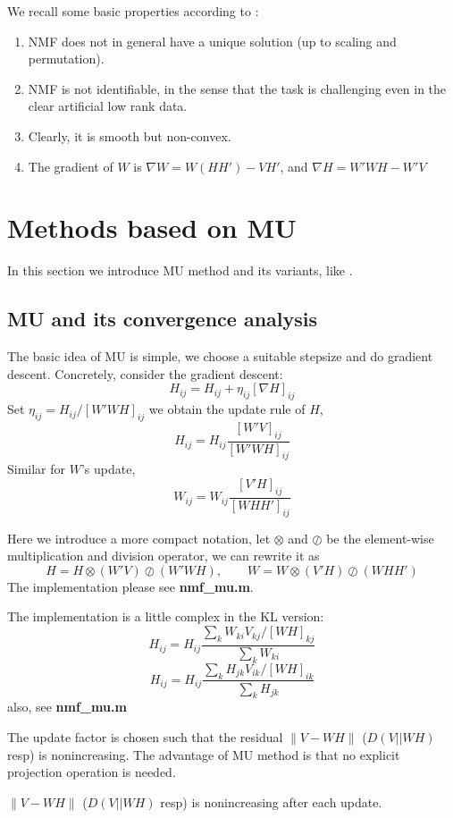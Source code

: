 \documentclass{article}
\renewcommand{\grad}{\nabla}
\begin{document}
We recall some basic properties according to \cite{review}:
\begin{enumerate}
	\item NMF does not in general have a unique solution (up to scaling and permutation).
	\item NMF is not identifiable, in the sense that the task is challenging even in the clear artificial low rank data.
	\item Clearly, it is smooth but non-convex.
	\item The gradient of $W$ is $\nabla W = W(HH')-VH'$, and $\nabla H = W'WH-W'V$
\end{enumerate}
\section{Methods based on MU}
In this section we introduce MU method and its variants, like \cite{mu,muacc,mumod,mumod2}.
\subsection{MU and its convergence analysis}
The basic idea of MU is simple, we choose a suitable stepsize and do gradient descent. Concretely, consider the gradient descent:
$$ H_{ij} = H_{ij} + \eta_{ij}[\grad H]_{ij}$$
Set $\eta_{ij} = H_{ij}/[W'WH]_{ij}$ we obtain the update rule of $H$, 
$$ H_{ij} = H_{ij}\frac{[W'V]_{ij}}{[W'WH]_{ij}}$$
Similar for $W$'s update, 
$$W_{ij} = W_{ij}\frac{[V'H]_{ij}}{[WHH']_{ij}}$$

Here we introduce a more compact notation, let $\otimes$ and  $\oslash$ be the element-wise multiplication and division operator, we can rewrite it as 
$$H = H\otimes (W'V) \oslash (W'WH), \qquad W = W\otimes (V'H) \oslash (WHH')$$
The implementation please see \textbf{nmf\_mu.m}.

The implementation is a little complex in the KL version:
$$H_{ij} = H_{ij}\frac{\sum_k W_{ki}V_{kj}/[WH]_{kj}}{\sum_k W_{ki}}$$
$$H_{ij} = H_{ij}\frac{\sum_k H_{jk}V_{ik}/[WH]_{ik}}{\sum_k H_{jk}}$$
also, see \textbf{nmf\_mu.m}

The update factor is chosen such that the residual $\|V-WH\|$ ($D(V||WH)$ resp) is nonincreasing. The advantage of MU method is that no explicit projection operation is needed.

\begin{proposition}
	$\|V-WH\|$ ($D(V||WH)$ resp) is nonincreasing after each update.
\end{proposition}
\end{document}
